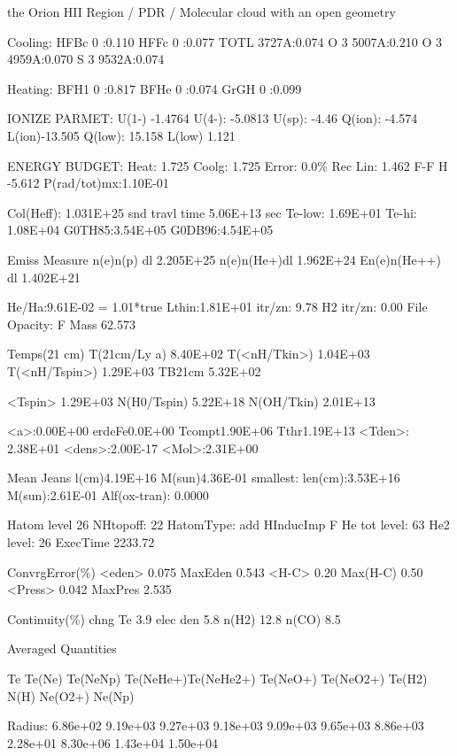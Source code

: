 { 
 the Orion HII Region / PDR / Molecular cloud with an open geometry  

 Cooling:  HFBc     0 :0.110 HFFc     0 :0.077 TOTL  3727A:0.074 O  3 
5007A:0.210 O  3  4959A:0.070 S  3  9532A:0.074  

 Heating:  BFH1     0 :0.817 BFHe     0 :0.074 GrGH     0 :0.099  

 
 IONIZE PARMET:  U(1-) -1.4764  U(4-): -5.0813  U(sp): -4.46  Q(ion):  
-4.574  L(ion)-13.505   Q(low): 15.158      L(low)  1.121

 
ENERGY BUDGET:  Heat:   1.725  Coolg:   1.725  Error:  0.0\%  Rec Lin: 
1.462  F-F  H -5.612   P(rad/tot)mx:1.10E-01

 
     Col(Heff):      1.031E+25  snd travl time  5.06E+13 sec  Te-low:
1.69E+01  Te-hi: 1.08E+04 G0TH85:3.54E+05   G0DB96:4.54E+05

 
  Emiss Measure    n(e)n(p) dl       2.205E+25  n(e)n(He+)dl        
1.962E+24  En(e)n(He++) dl      1.402E+21

 
He/Ha:9.61E-02  =   1.01*true  Lthin:1.81E+01  itr/zn: 9.78  H2 itr/zn:
0.00  File Opacity: F Mass 62.573

 
   Temps(21 cm)   T(21cm/Ly a)  8.40E+02        T(<nH/Tkin>)  1.04E+03 
T(<nH/Tspin>)   1.29E+03          TB21cm       5.32E+02

        <Tspin>  1.29E+03       N(H0/Tspin)     5.22E+18      N(OH/Tkin)
2.01E+13


   <a>:0.00E+00  erdeFe0.0E+00  Tcompt1.90E+06  Tthr1.19E+13  <Tden>:
2.38E+01  <dens>:2.00E-17 <Mol>:2.31E+00


     Mean Jeans  l(cm)4.19E+16  M(sun)4.36E-01  smallest:    
len(cm):3.53E+16  M(sun):2.61E-01 Alf(ox-tran):     0.0000


Hatom level 26  NHtopoff:  22  HatomType: add  HInducImp  F  He tot level:
63  He2 level:   26 ExecTime 2233.72


 ConvrgError(\%)  <eden>  0.075  MaxEden  0.543  <H-C>   0.20  Max(H-C)
0.50  <Press>   0.042 MaxPres  2.535

  Continuity(\%)  chng Te   3.9  elec den   5.8  n(H2)   12.8  n(CO)   
8.5


                                                        Averaged Quantities

             Te      Te(Ne)   Te(NeNp)  Te(NeHe+)Te(NeHe2+) Te(NeO+) 
Te(NeO2+)  Te(H2)     N(H)     Ne(O2+)   Ne(Np)   

 Radius:  6.86e+02  9.19e+03  9.27e+03  9.18e+03  9.09e+03  9.65e+03 
8.86e+03  2.28e+01  8.30e+06  1.43e+04  1.50e+04





}
